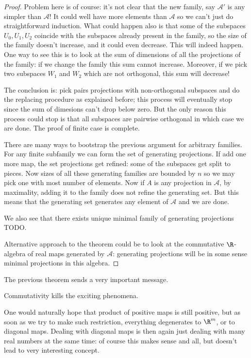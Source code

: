 \begin{proof}
	Problem here is of course: it's not clear that the new family, say $\mathcal{A}'$ is any simpler than $\mathcal{A}$! It could well have more elements than $\mathcal{A}$ so we can't just do straightforward induction. What could happen also is that some of the subspaces $U_{0}, U_{1}, U_{2}$ coincide with the subspaces already present in the family, so the size of the family doesn't increase, and it could even decrease. This will indeed happen. One way to see this is to look at the sum of dimensions of all the projections of the family: if we change the family this sum cannot increase. Moreover, if we pick two subspaces $W_{1}$ and $W_{2}$ which are not orthogonal, this sum will decrease!

	The conclusion is: pick pairs projections with non-orthogonal subspaces and do the replacing procedure as explained before; this process will eventually stop since the sum of dimesions can't drop below zero. But the only reason this process could stop is that all subspaces are pairwise orthogonal in which case we are done. The proof of finite case is complete.

	There are many ways to bootstrap the previous argument for arbitrary families. For any finite subfamily we can form the set of generating projections. If add one more map, the set projections get refined: some of the subspaces get split to pieces. Now sizes of all these generating families are bounded by $n$ so we may pick one with most number of elements. Now if $A$ is any projection in $\mathcal{A}$, by maximality, adding it to the family does not refine the generating set. But this means that the generating set generates any element of $\mathcal{A}$ and we are done.

	We also see that there exists unique minimal family of generating projections TODO.

	Alternative approach to the theorem could be to look at the commutative $\R$-algebra of real maps generated by $\mathcal{A}$: generating projections will be in some sense minimal projections in this algebra.
\end{proof}

The previous theorem sends a very important message.

\begin{phil}
	Commutativity kills the exciting phenomena.
\end{phil}

One would naturally hope that product of positive maps is still positive, but as soon as we try to make such restriction, everything degenerates to $\R^{m}$, or to diagonal maps. Dealing with diagonal maps is then again just dealing with many real numbers at the same time: of course this makes sense and all, but doesn't lead to very interesting concept.


